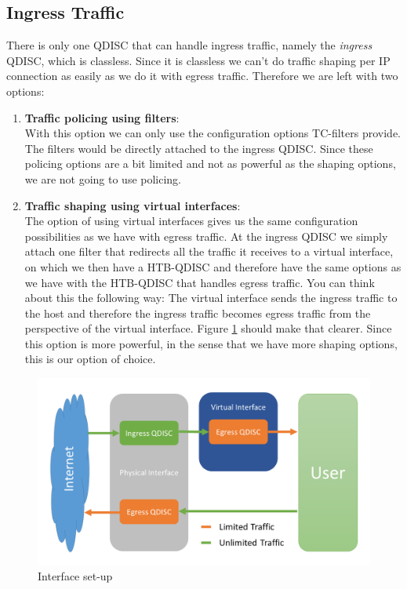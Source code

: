 \newpage
\subsection{Ingress Traffic} \label{Ingress Traffic}
There is only one \acs{QDISC} that can handle ingress traffic, namely the \textit{ingress} \acs{QDISC}, which is classless. Since it is classless we can't do traffic shaping per \acs{IP} connection as easily as we do it with egress traffic. Therefore we are left with two options:
\begin{enumerate}
\item \textbf{Traffic policing using filters}:
\\With this option we can only use the configuration options \acs{TC}-filters provide. The filters would be directly attached to the ingress \acs{QDISC}. Since these policing options are a bit limited and not as powerful as the shaping options, we are not going to use policing.
\item \textbf{Traffic shaping using virtual interfaces}:
\\The option of using virtual interfaces gives us the same configuration possibilities as we have with egress traffic. At the ingress \acs{QDISC} we simply attach one filter that redirects all the traffic it receives to a virtual interface, on which we then have a \acs{HTB}-\acs{QDISC} and therefore have the same options as we have with the \acs{HTB}-\acs{QDISC} that handles egress traffic. You can think about this the following way: The virtual interface sends the ingress traffic to the host and therefore the ingress traffic becomes egress traffic from the perspective of the virtual interface. Figure \ref{Interface set-up} should make that clearer. Since this option is more powerful, in the sense that we have more shaping options, this is our option of choice.
\end{enumerate}

\begin{figure}[h]
	\centering
	\includegraphics[width=\textwidth]{img/Interface-Setup.png}
	\caption{Interface set-up}
	\label{Interface set-up}
\end{figure}